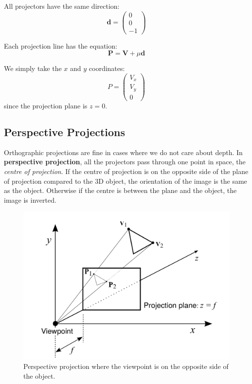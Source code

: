 \documentclass[11pt]{article}
\begin{document}
All projectors have the same direction:
\[ \bm{d} = \begin{pmatrix} 0 \\ 0 \\ - 1 \end{pmatrix} \]

Each projection line has the equation:
\[ \bm{P} = \bm{V} + \mu\bm{d} \]

We simply take the $x$ and $y$ coordinates:
\[ P = \begin{pmatrix} V_x \\ V_y \\ 0 \end{pmatrix} \]
since the projection plane is $z = 0$.

\subsection{Perspective Projections}
Orthographic projections are fine in cases where we do not care about depth.
In \textbf{perspective projection}, all the projectors pass through one point in space, the \textit{centre of projection}.
If the centre of projection is on the opposite side of the plane of projection compared to the 3D object, the orientation of the image is the same as the object.
Otherwise if the centre is between the plane and the object, the image is inverted.

\begin{figure}[htb!]
  \caption{Perspective projection where the viewpoint is on the opposite side of the object.}
  \includegraphics[scale=0.3]{perspective}
  \centering
\end{figure}
\end{document}
